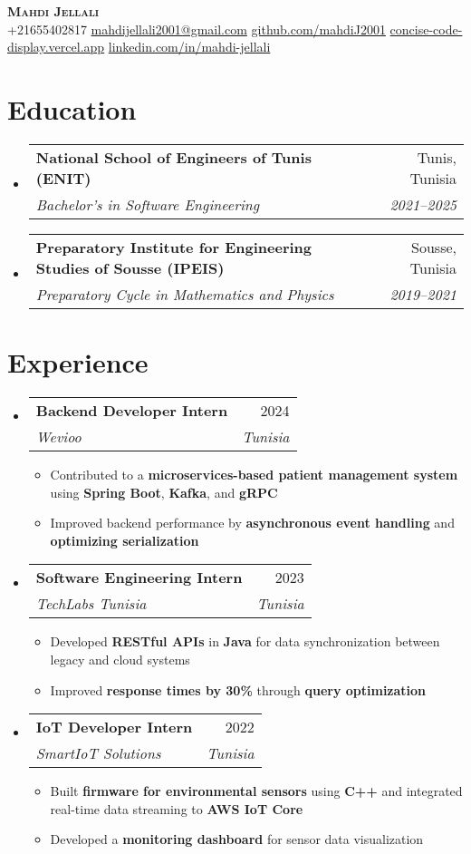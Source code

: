 \documentclass[letterpaper,11pt]{article}
\makeatletter
\newcommand{\resumeItem}[1]{
    \item\small{
            {#1 \vspace{-2pt}}
    }
}
\newcommand{\resumeSubheading}[4]{
    \vspace{-2pt}\item
    \begin{tabular*}{0.97\textwidth}[t]{l@{\extracolsep{\fill}}r}
    \textbf{#1} & #2 \\
    \textit{\small#3} & \textit{\small #4} \\
    \end{tabular*}\vspace{-7pt}
}
\newcommand{\resumeSubHeadingListStart}{\begin{itemize}[leftmargin=0.15in, label={}]}
\newcommand{\resumeSubHeadingListEnd}{\end{itemize}}
\newcommand{\resumeItemListStart}{\begin{itemize}}
\newcommand{\resumeItemListEnd}{\end{itemize}\vspace{-5pt}}
\makeatother
\begin{document}
\begin{center}
\textbf{\Huge \scshape Mahdi Jellali} \\ \vspace{1pt}
\small
+21655402817 \quad
\href{mailto:mahdijellali2001@gmail.com}{mahdijellali2001@gmail.com} \quad
\href{https://github.com/mahdiJ2001}{github.com/mahdiJ2001} \quad
\href{https://concise-code-display.vercel.app/}{concise-code-display.vercel.app} \quad
\href{https://www.linkedin.com/in/mahdi-jellali/}{linkedin.com/in/mahdi-jellali}
\end{center}

\vspace{10pt}
\section{Education}
\resumeSubHeadingListStart
\resumeSubheading
{National School of Engineers of Tunis (ENIT)}{Tunis, Tunisia}
{Bachelor’s in Software Engineering}{2021--2025}
\resumeSubheading
{Preparatory Institute for Engineering Studies of Sousse (IPEIS)}{Sousse, Tunisia}
{Preparatory Cycle in Mathematics and Physics}{2019--2021}
\resumeSubHeadingListEnd

\section{Experience}
\resumeSubHeadingListStart
\resumeSubheading
{Backend Developer Intern}{2024}
{Wevioo}{Tunisia}
\resumeItemListStart
\resumeItem{Contributed to a \textbf{microservices-based patient management system} using \textbf{Spring Boot}, \textbf{Kafka}, and \textbf{gRPC}}
\resumeItem{Improved backend performance by \textbf{asynchronous event handling} and \textbf{optimizing serialization}}
\resumeItemListEnd
\resumeSubheading
{Software Engineering Intern}{2023}
{TechLabs Tunisia}{Tunisia}
\resumeItemListStart
\resumeItem{Developed \textbf{RESTful APIs} in \textbf{Java} for data synchronization between legacy and cloud systems}
\resumeItem{Improved \textbf{response times by 30\%} through \textbf{query optimization}}
\resumeItemListEnd
\resumeSubheading
{IoT Developer Intern}{2022}
{SmartIoT Solutions}{Tunisia}
\resumeItemListStart
\resumeItem{Built \textbf{firmware for environmental sensors} using \textbf{C++} and integrated real-time data streaming to \textbf{AWS IoT Core}}
\resumeItem{Developed a \textbf{monitoring dashboard} for sensor data visualization}
\resumeItemListEnd
\resumeSubHeadingListEnd
\end{document}
